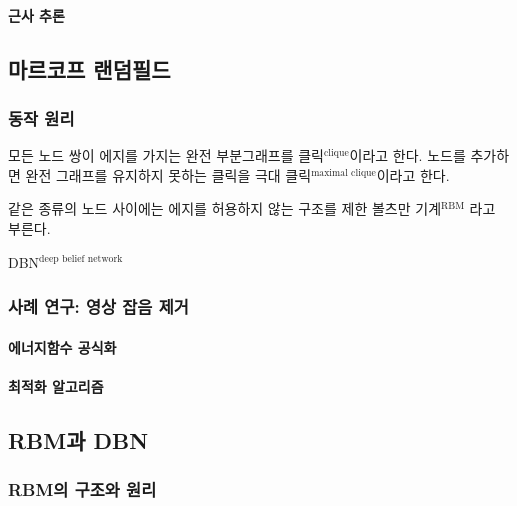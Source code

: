 \documentclass [12pt] {oblivoir}
\let\oldsubsubsection=\subsubsection
\renewcommand{\subsubsection}
{
  \filbreak
  \oldsubsubsection
}
\begin{document}
\paragraph*{근사 추론}\mbox{}

\vspace{3mm}

\subsection{마르코프 랜덤필드}

\subsubsection{동작 원리}

모든 노드 쌍이 에지를 가지는 완전 부분그래프를 클릭$^{\text{clique}}$이라고 한다. 노드를 추가하면 완전 그래프를 유지하지 못하는 클릭을 극대 클릭$^{\text{maximal clique}}$이라고 한다.

\vspace{3mm}
같은 종류의 노드 사이에는 에지를 허용하지 않는 구조를 제한 볼츠만 기계$^{\text{RBM}}$ 라고 부른다.

DBN$^\text{deep belief network}$

\subsubsection{사례 연구: 영상 잡음 제거}

\paragraph*{에너지함수 공식화}\mbox{}

\vspace{3mm}

\paragraph*{최적화 알고리즘}\mbox{}

\vspace{3mm}

\subsection{RBM과 DBN}

\subsubsection{RBM의 구조와 원리}
\end{document}
